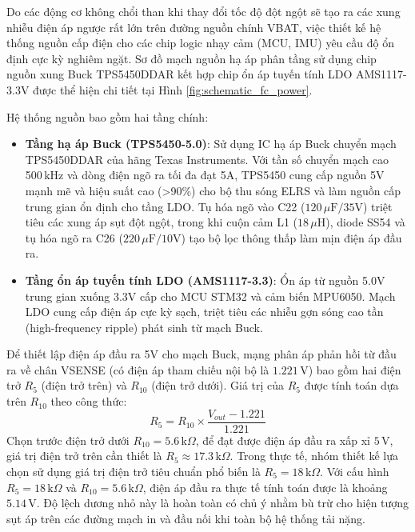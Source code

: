 Do các động cơ không chổi than khi thay đổi tốc độ đột ngột sẽ tạo ra các xung nhiễu điện áp ngược rất lớn trên đường nguồn chính VBAT, việc thiết kế hệ thống nguồn cấp điện cho các chip logic nhạy cảm (MCU, IMU) yêu cầu độ ổn định cực kỳ nghiêm ngặt. Sơ đồ mạch nguồn hạ áp phân tầng sử dụng chip nguồn xung Buck TPS5450DDAR kết hợp chip ổn áp tuyến tính LDO AMS1117-3.3V được thể hiện chi tiết tại Hình \ref{fig:schematic_fc_power}.

Hệ thống nguồn bao gồm hai tầng chính:
\begin{itemize}
    \item \textbf{Tầng hạ áp Buck (TPS5450-5.0)}: Sử dụng IC hạ áp Buck chuyển mạch TPS5450DDAR của hãng Texas Instruments. Với tần số chuyển mạch cao 500\,kHz và dòng điện ngõ ra tối đa đạt 5A, TPS5450 cung cấp nguồn 5V mạnh mẽ và hiệu suất cao (>90\%) cho bộ thu sóng ELRS và làm nguồn cấp trung gian ổn định cho tầng LDO. Tụ hóa ngõ vào C22 ($120\,\mu\text{F}/35\text{V}$) triệt tiêu các xung áp sụt đột ngột, trong khi cuộn cảm L1 ($18\,\mu\text{H}$), diode SS54 và tụ hóa ngõ ra C26 ($220\,\mu\text{F}/10\text{V}$) tạo bộ lọc thông thấp làm mịn điện áp đầu ra.
    \item \textbf{Tầng ổn áp tuyến tính LDO (AMS1117-3.3)}: Ổn áp từ nguồn 5.0V trung gian xuống 3.3V cấp cho MCU STM32 và cảm biến MPU6050. Mạch LDO cung cấp điện áp cực kỳ sạch, triệt tiêu các nhiễu gợn sóng cao tần (high-frequency ripple) phát sinh từ mạch Buck.
\end{itemize}

Để thiết lập điện áp đầu ra 5V cho mạch Buck, mạng phân áp phản hồi từ đầu ra về chân VSENSE (có điện áp tham chiếu nội bộ là $1.221\,\text{V}$) bao gồm hai điện trở $R_5$ (điện trở trên) và $R_{10}$ (điện trở dưới). Giá trị của $R_5$ được tính toán dựa trên $R_{10}$ theo công thức:
\begin{equation}
R_5 = R_{10} \times \frac{V_{out} - 1.221}{1.221}
\end{equation}
Chọn trước điện trở dưới $R_{10} = 5.6\,\text{k}\Omega$, để đạt được điện áp đầu ra xấp xỉ $5\,\text{V}$, giá trị điện trở trên cần thiết là $R_5 \approx 17.3\,\text{k}\Omega$. Trong thực tế, nhóm thiết kế lựa chọn sử dụng giá trị điện trở tiêu chuẩn phổ biến là $R_5 = 18\,\text{k}\Omega$. Với cấu hình $R_5 = 18\,\text{k}\Omega$ và $R_{10} = 5.6\,\text{k}\Omega$, điện áp đầu ra thực tế tính toán được là khoảng $5.14\,\text{V}$. Độ lệch dương nhỏ này là hoàn toàn có chủ ý nhằm bù trừ cho hiện tượng sụt áp trên các đường mạch in và đầu nối khi toàn bộ hệ thống tải nặng.

